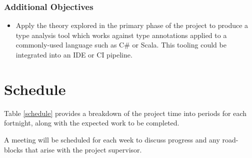 \documentclass[a4paper]{article}
\begin{document}
    \subsubsection*{Additional Objectives}
    
    \begin{itemize}
        \item Apply the theory explored in the primary phase of the project to produce a type analysis tool which works against type annotations applied to a commonly-used language such as C\# or Scala. This tooling could be integrated into an IDE or CI pipeline.
    \end{itemize}
    
    \section*{Schedule}
    
    Table \ref{schedule} provides a breakdown of the project time into periods for each fortnight, along with the expected work to be completed.
    
    A meeting will be scheduled for each week to discuss progress and any road-blocks that arise with the project supervisor.
    
\end{document}
